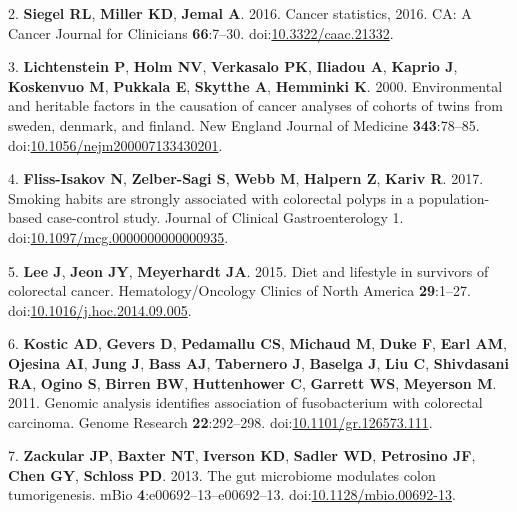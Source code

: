 \documentclass[11pt,]{article}
\begin{document}
\hypertarget{ref-Siegel2016}{}
2. \textbf{Siegel RL}, \textbf{Miller KD}, \textbf{Jemal A}. 2016.
Cancer statistics, 2016. CA: A Cancer Journal for Clinicians
\textbf{66}:7--30.
doi:\href{https://doi.org/10.3322/caac.21332}{10.3322/caac.21332}.

\hypertarget{ref-Lichtenstein2000}{}
3. \textbf{Lichtenstein P}, \textbf{Holm NV}, \textbf{Verkasalo PK},
\textbf{Iliadou A}, \textbf{Kaprio J}, \textbf{Koskenvuo M},
\textbf{Pukkala E}, \textbf{Skytthe A}, \textbf{Hemminki K}. 2000.
Environmental and heritable factors in the causation of cancer analyses
of cohorts of twins from sweden, denmark, and finland. New England
Journal of Medicine \textbf{343}:78--85.
doi:\href{https://doi.org/10.1056/nejm200007133430201}{10.1056/nejm200007133430201}.

\hypertarget{ref-FlissIsakov2017}{}
4. \textbf{Fliss-Isakov N}, \textbf{Zelber-Sagi S}, \textbf{Webb M},
\textbf{Halpern Z}, \textbf{Kariv R}. 2017. Smoking habits are strongly
associated with colorectal polyps in a population-based case-control
study. Journal of Clinical Gastroenterology 1.
doi:\href{https://doi.org/10.1097/mcg.0000000000000935}{10.1097/mcg.0000000000000935}.

\hypertarget{ref-Lee2015}{}
5. \textbf{Lee J}, \textbf{Jeon JY}, \textbf{Meyerhardt JA}. 2015. Diet
and lifestyle in survivors of colorectal cancer. Hematology/Oncology
Clinics of North America \textbf{29}:1--27.
doi:\href{https://doi.org/10.1016/j.hoc.2014.09.005}{10.1016/j.hoc.2014.09.005}.

\hypertarget{ref-Kostic2011}{}
6. \textbf{Kostic AD}, \textbf{Gevers D}, \textbf{Pedamallu CS},
\textbf{Michaud M}, \textbf{Duke F}, \textbf{Earl AM}, \textbf{Ojesina
AI}, \textbf{Jung J}, \textbf{Bass AJ}, \textbf{Tabernero J},
\textbf{Baselga J}, \textbf{Liu C}, \textbf{Shivdasani RA},
\textbf{Ogino S}, \textbf{Birren BW}, \textbf{Huttenhower C},
\textbf{Garrett WS}, \textbf{Meyerson M}. 2011. Genomic analysis
identifies association of fusobacterium with colorectal carcinoma.
Genome Research \textbf{22}:292--298.
doi:\href{https://doi.org/10.1101/gr.126573.111}{10.1101/gr.126573.111}.

\hypertarget{ref-Zackular2013}{}
7. \textbf{Zackular JP}, \textbf{Baxter NT}, \textbf{Iverson KD},
\textbf{Sadler WD}, \textbf{Petrosino JF}, \textbf{Chen GY},
\textbf{Schloss PD}. 2013. The gut microbiome modulates colon
tumorigenesis. mBio \textbf{4}:e00692--13--e00692--13.
doi:\href{https://doi.org/10.1128/mbio.00692-13}{10.1128/mbio.00692-13}.
\end{document}
